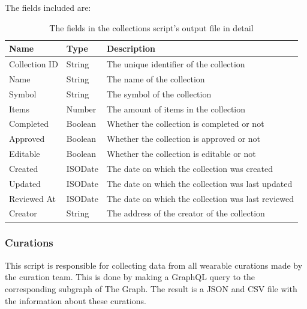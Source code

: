 \documentclass[MSE,Master,english]{twbook}%
\begin{document}
The fields included are:
\begin{table}[H]
  \centering
  \begin{tabularx}{\textwidth}{|l|l|X|}
  \hline
  \textbf{Name} & \textbf{Type} & \textbf{Description}                               \\ \hline
  Collection ID & String        & The unique identifier of the collection            \\ \hline
  Name          & String        & The name of the collection                         \\ \hline
  Symbol        & String        & The symbol of the collection                       \\ \hline
  Items         & Number        & The amount of items in the collection              \\ \hline
  Completed     & Boolean       & Whether the collection is completed or not         \\ \hline
  Approved      & Boolean       & Whether the collection is approved or not          \\ \hline
  Editable      & Boolean       & Whether the collection is editable or not          \\ \hline
  Created       & ISODate       & The date on which the collection was created       \\ \hline
  Updated       & ISODate       & The date on which the collection was last updated  \\ \hline
  Reviewed At   & ISODate       & The date on which the collection was last reviewed \\ \hline
  Creator       & String        & The address of the creator of the collection       \\ \hline
  \end{tabularx}
  \caption{The fields in the collections script's output file in detail}
  \label{table:collections}
  \end{table}

\subsubsection{Curations}
This script is responsible for collecting data from all wearable curations made by the curation team. This is done by making a GraphQL query to the corresponding subgraph of The Graph. The result is a JSON and CSV file with the information about these curations. \\
\end{document}
